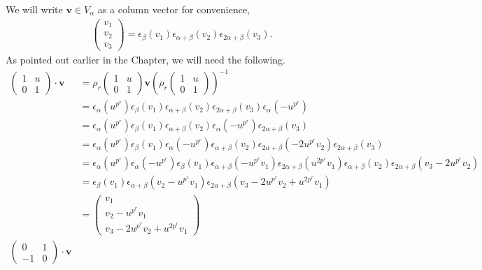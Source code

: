We will write $\mathbf{v}\in V_\alpha$ as a column vector for convenience,
\begin{align*}
	\left(\begin{matrix}v_1\\v_2\\v_3\end{matrix}\right) = \epsilon_\beta(v_1)\epsilon_{\alpha+\beta}(v_2)\epsilon_{2\alpha+\beta}(v_3).
\end{align*}
As pointed out earlier in the Chapter, we will need the following.
\begin{align*}
\left(\begin{matrix} 1 & u \\ 0 & 1\end{matrix}\right) \cdot \mathbf{v} 
&= 
\rho_r\left(\begin{matrix} 1 & u \\ 0 & 1\end{matrix}\right) \mathbf{v}\left( \rho_r\left(\begin{matrix} 1 & u \\ 0 & 1\end{matrix}\right)\right)^{-1} \\
&=
\epsilon_ \alpha (u^{p^r}) \epsilon_ \beta (v_1)\epsilon_{\alpha+\beta}(v_2) \epsilon_{2\alpha+\beta}(v_3) \epsilon_ \alpha (-u^{p^r}) \\
&=
\epsilon_ \alpha (u^{p^r}) \epsilon_ \beta (v_1) \epsilon_{\alpha+\beta}(v_2) \epsilon_ \alpha (-u^{p^r}) \epsilon_{2\alpha+\beta}(v_3) \\
&=
\epsilon_ \alpha (u^{p^r}) \epsilon_ \beta (v_1)  \epsilon_ \alpha (-u^{p^r}) \epsilon_{\alpha+\beta}(v_2) \epsilon_{2\alpha+\beta}(-2u^{p^r}v_2)\epsilon_{2\alpha+\beta}(v_3)\\
&=
\epsilon_ \alpha (u^{p^r}) \epsilon_ \alpha (-u^{p^r})  \epsilon_ \beta (v_1) \epsilon_{\alpha+\beta}(-u^{p^r}v_1) \epsilon_{2\alpha+\beta}(u^{2p^r}v_1) \epsilon_{\alpha+\beta}(v_2) \epsilon_{2\alpha+\beta}(v_3-2u^{p^r}v_2)\\
&=
\epsilon_ \beta (v_1)  \epsilon_{\alpha+\beta}(v_2-u^{p^r}v_1) \epsilon_{2\alpha+\beta}(v_3-2u^{p^r}v_2 + u^{2p^r}v_1)\\
&= \left(\begin{matrix} v_1 \\ v_2-u^{p^r}v_1 \\ v_3-2u^{p^r}v_2 + u^{2p^r}v_1 \end{matrix}\right) \\
\left(\begin{matrix} 0 & 1 \\ -1 & 0 \end{matrix}\right) \cdot \mathbf{v} 

\end{align*}
